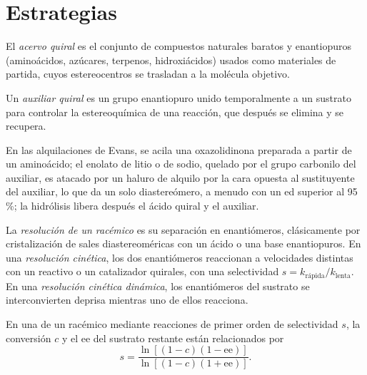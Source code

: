 \section{Estrategias}

\begin{definition}\label{def:b3:asymmetric-synthesis:chiral-pool}
El \emph{acervo quiral} es el conjunto de compuestos naturales baratos
y enantiopuros (aminoácidos, azúcares, terpenos, hidroxiácidos) usados como
materiales de partida, cuyos estereocentros se trasladan a la molécula objetivo.
\end{definition}

\begin{definition}\label{def:b3:asymmetric-synthesis:auxiliary}
Un \emph{auxiliar quiral} es un grupo enantiopuro
unido temporalmente a un sustrato para controlar la estereoquímica de una
reacción, que después se elimina y se recupera.
\end{definition}

En las alquilaciones de Evans, se acila una oxazolidinona preparada a partir de un aminoácido;
el enolato de litio o de sodio, quelado por el grupo carbonilo del auxiliar, es
atacado por un haluro de alquilo por la cara opuesta al sustituyente del auxiliar,
lo que da un solo diastereómero, a menudo con un ed superior al 95\,\%; la hidrólisis libera después el
ácido quiral y el auxiliar.

\begin{definition}[Resoluciones]\label{def:b3:asymmetric-synthesis:resolution}
La \emph{resolución de un racémico} es su
separación en enantiómeros, clásicamente por cristalización de sales diastereoméricas
con un ácido o una base enantiopuros. En una \emph{resolución cinética},
los dos enantiómeros reaccionan a velocidades distintas con un reactivo o un
catalizador quirales, con una selectividad $s = k_{\text{rápida}}/k_{\text{lenta}}$. En una \emph{resolución
cinética dinámica}, los enantiómeros del sustrato
se interconvierten deprisa mientras uno de ellos reacciona.
\end{definition}

\begin{theorem}\label{thm:b3:asymmetric-synthesis:kagan}
En una  de un racémico mediante reacciones de primer orden de selectividad $s$,
la conversión $c$ y el ee del sustrato restante están relacionados por
\[
  s = \frac{\ln[(1 - c)(1 - \mathrm{ee})]}{\ln[(1 - c)(1 + \mathrm{ee})]}.
\]
\end{theorem}

